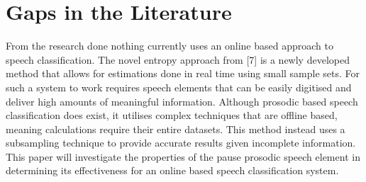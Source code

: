\chapter{Gaps in the Literature}
From the research done nothing currently uses an online based approach to speech classification. The novel entropy approach from [7] is a newly developed method that allows for estimations done in real time using small sample sets. For such a system to work requires speech elements that can be easily digitised and deliver high amounts of meaningful information. Although prosodic based speech classification does exist, it utilises complex techniques that are offline based, meaning calculations require their entire datasets. This method instead uses a subsampling technique to provide accurate results given incomplete information. This paper will investigate the properties of the pause prosodic speech element in determining its effectiveness for an online based speech classification system.


